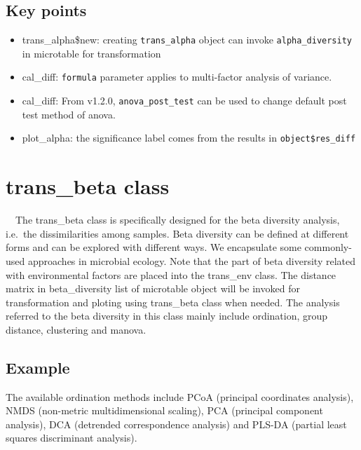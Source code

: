 \documentclass[
]{book}
\newenvironment{Shaded}{\begin{snugshade}}{\end{snugshade}}
\newcommand{\AttributeTok}[1]{\textcolor[rgb]{0.13,0.29,0.53}{#1}}
\newcommand{\CommentTok}[1]{\textcolor[rgb]{0.56,0.35,0.01}{\textit{#1}}}
\newcommand{\FunctionTok}[1]{\textcolor[rgb]{0.13,0.29,0.53}{\textbf{#1}}}
\newcommand{\NormalTok}[1]{#1}
\newcommand{\OtherTok}[1]{\textcolor[rgb]{0.56,0.35,0.01}{#1}}
\newcommand{\SpecialCharTok}[1]{\textcolor[rgb]{0.81,0.36,0.00}{\textbf{#1}}}
\newcommand{\StringTok}[1]{\textcolor[rgb]{0.31,0.60,0.02}{#1}}
\providecommand{\tightlist}{%
  \setlength{\itemsep}{0pt}\setlength{\parskip}{0pt}}
\begin{document}
\subsection{Key points}\label{key-points-3}

\begin{itemize}
\tightlist
\item
  trans\_alpha\$new: creating \texttt{trans\_alpha} object can invoke \texttt{alpha\_diversity} in microtable for transformation
\item
  cal\_diff: \texttt{formula} parameter applies to multi-factor analysis of variance.
\item
  cal\_diff: From v1.2.0, \texttt{anova\_post\_test} can be used to change default post test method of anova.
\item
  plot\_alpha: the significance label comes from the results in \texttt{object\$res\_diff}
\end{itemize}

\section{trans\_beta class}\label{trans_beta-class}

　The trans\_beta class is specifically designed for the beta diversity analysis, i.e.~the dissimilarities among samples.
Beta diversity can be defined at different forms\citep{Tuomisto_diversity_2010} and can be explored with different ways\citep{Anderson_Navigating_2011}.
We encapsulate some commonly-used approaches in microbial ecology\citep{Ramette_Multivariate_2007}.
Note that the part of beta diversity related with environmental factors are placed into the trans\_env class.
The distance matrix in beta\_diversity list of microtable object will be invoked for transformation and ploting using trans\_beta class when needed.
The analysis referred to the beta diversity in this class mainly include ordination, group distance, clustering and manova.

\subsection{Example}\label{example-3}

The available ordination methods include PCoA (principal coordinates analysis), NMDS (non-metric multidimensional scaling),
PCA (principal component analysis), DCA (detrended correspondence analysis) and PLS-DA (partial least squares discriminant analysis).

\begin{Shaded}
\end{Shaded}
\end{document}
